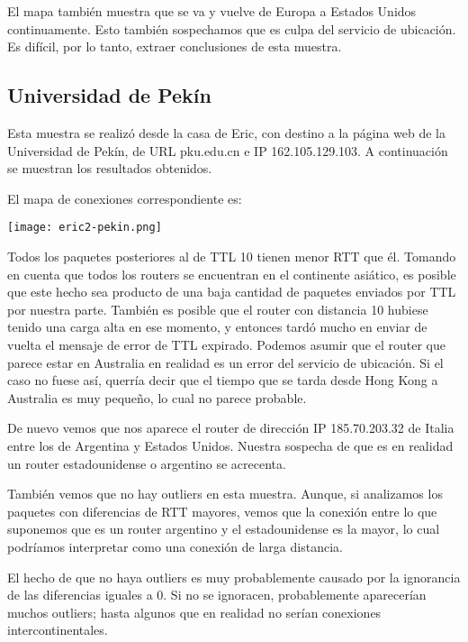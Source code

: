 El mapa también muestra que se va y vuelve de Europa a Estados Unidos continuamente.
Esto también sospechamos que es culpa del servicio de ubicación. Es difícil,
por lo tanto, extraer conclusiones de esta muestra.


\subsection{Universidad de Pekín}
Esta muestra se realizó desde la casa de Eric, con destino a la página web de 
la Universidad de Pekín, de URL pku.edu.cn e IP 162.105.129.103.
A continuación se muestran los resultados obtenidos.



El mapa de conexiones correspondiente es:

\begin{center}
    \texttt{[image: eric2-pekin.png]}
\end{center}

Todos los paquetes posteriores al de TTL 10 tienen menor RTT que él. Tomando
en cuenta que todos los routers se encuentran en el continente asiático, es
posible que este hecho sea producto de una baja cantidad de paquetes enviados
por TTL por nuestra parte. También es posible que el router con distancia 10
hubiese tenido una carga alta en ese momento, y entonces tardó mucho en enviar
de vuelta el mensaje de error de TTL expirado. Podemos asumir que el router que
parece estar en Australia en realidad es un error del servicio de ubicación.
Si el caso no fuese así, querría decir que el tiempo que se tarda desde Hong Kong
a Australia es muy pequeño, lo cual no parece probable.

De nuevo vemos que nos aparece el router de dirección IP 185.70.203.32
de Italia entre los de Argentina y Estados Unidos. Nuestra sospecha de que 
es en realidad un router estadounidense o argentino se acrecenta.

También vemos que no hay outliers en esta muestra. Aunque, si analizamos
los paquetes con diferencias de RTT mayores, vemos que la conexión entre
lo que suponemos que es un router argentino y el estadounidense es la mayor,
lo cual podríamos interpretar como una conexión de larga distancia. 

El hecho de que no haya outliers es muy probablemente causado por la ignorancia
de las diferencias iguales a 0. Si no se ignoracen, probablemente aparecerían
muchos outliers; hasta algunos que en realidad no serían conexiones
intercontinentales. 
